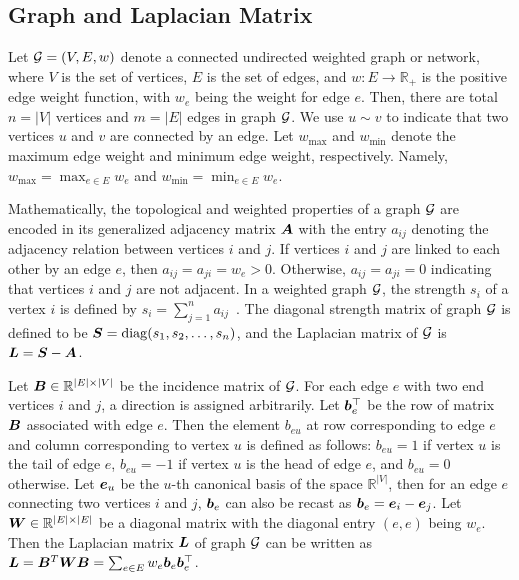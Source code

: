 \documentclass[journal]{IEEEtran}
\begin{document}
\subsection{Graph and Laplacian Matrix}

Let \(\mathcal{G}=(V,E,w)\) denote a connected undirected weighted graph or network,  where \(V\) is the set of vertices,  \(E\) is the set of edges, and  \(w: E\to \mathbb{R}_{+}\) is the positive edge weight function, with \(w_e\) being the weight for edge \(e\). Then, there are total \(n=|V|\) vertices and \(m=|E|\) edges in graph \(\mathcal{G}\). We use \(u \sim v\) to indicate that two vertices \(u\) and \(v\) are connected by an edge. Let \(w_{\max}\) and \(w_{\min}\) denote the maximum edge weight and minimum edge weight, respectively. Namely, \(w_{\max}=\max_{e\in E} w_e \) and \(w_{\min}=\min_{e\in E} w_e\).

Mathematically, the topological and weighted properties of a graph \(\mathcal{G}\) are encoded in its generalized adjacency matrix \(\boldsymbol{A}\) with the entry \(a_{ij}\) denoting the adjacency relation between vertices \(i\) and \(j\). If vertices \(i\) and \(j\) are linked to each other by an edge \(e\), then \(a_{ij}= a_{ji}=w_{e}> 0\). Otherwise, \(a_{ij}=a_{ji}=0\) indicating that vertices \(i\) and \(j\) are not adjacent. In a weighted graph \(\mathcal{G}\), the strength  \(s_i\) of a vertex \(i\) is defined by \(s_i=\sum_{j=1}^n a_{ij}\)~\cite{BaBaPaVe04}. The diagonal strength matrix of graph \(\mathcal{G}\) is defined to be \({\boldsymbol{S}} = {\rm diag}(s_1, s_2, \ldots, s_n)\), and the Laplacian matrix of \(\mathcal{G}\) is \({\boldsymbol{L}}={\boldsymbol{S}}-{\boldsymbol{A}}\).

Let \(\boldsymbol{B} \in \mathbb{R}^{|E| \times |V|}\) be the incidence matrix of \(\mathcal{G}\). For each edge \(e\) with two end vertices \(i\) and \(j\), a direction is assigned arbitrarily. Let \(\boldsymbol{b}_e^\top\) be the row of matrix \(\boldsymbol{B}\) associated with edge \(e\). Then the element \(b_{eu}\) at row corresponding to edge \(e\) and column corresponding to vertex \(u\) is defined as follows: \(b_{eu} = 1\) if vertex \(u\) is the tail of edge \(e\), \(b_{eu}=-1\) if vertex \(u\) is the head of  edge \(e\), and \(b_{eu}=0\) otherwise. Let \(\boldsymbol{e}_u\) be the \(u\)-th canonical basis of the space \(\mathbb{R}^{|V|}\), then for an edge \(e\) connecting two vertices \(i\) and \(j\), \(\boldsymbol{b}_e\) can also be recast as \(\boldsymbol{b}_e=\boldsymbol{e}_{i}-\boldsymbol{e}_{j}\).  Let  \(\boldsymbol{W} \in \mathbb{R}^{|E| \times |E|}\) be a diagonal matrix with the diagonal entry \((e,e)\) being \(w_e\). Then the Laplacian matrix \(\boldsymbol{L}\) of graph \(\mathcal{G}\) can be written as \(\boldsymbol{L}=\boldsymbol{B}^T\boldsymbol{W}\boldsymbol{B}=\sum_{e\in E}w_e\boldsymbol{b}_e\boldsymbol{b}_e^{\top}\).
\end{document}
